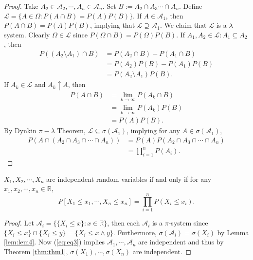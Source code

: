 \documentclass[11pt,singlecolumn, openany, citestyle=authoryear]{elegantbook}
\begin{document}
\begin{CJK}{UTF8}{gbsn}
\begin{proof}
    Take $A_2\in \mathcal{A}_2,\cdots,A_n \in\mathcal{A}_n$. Set $B:=A_2 \cap A_3\cdots \cap A_n$.
    Define $\mathcal{L}=\{A\in\Omega:P(A\cap B)=P(A)P(B)\}$. If $A \in \mathcal{A}_1$,
    then $P(A\cap B)=P(A)P(B)$, implying that $\mathcal{L}\supseteq \mathcal{A}_1$.
    We claim that $\mathcal{L}$ is a $\lambda$-system.
    Clearly $\Omega \in \mathcal{L}$ since $P(\Omega \cap B)=P(\Omega)P(B)$.
    If $A_1,A_2\in \mathcal{L}:A_1\subseteq A_2$, then 
    \begin{align*}
    P((A_2\setminus A_1) \cap B)&=P(A_2\cap B)-P(A_1 \cap B)\\
    &=P(A_2)P(B)-P(A_1)P(B)\\ 
    &=P(A_2\setminus A_1)P(B).
    \end{align*}
    If $A_k\in\mathcal{L}$ and $A_k \uparrow A$, then 
    \begin{align*}
        P(A\cap B) &= \lim_{k\to\infty} P(A_k\cap B)\\
        &=\lim_{k\to\infty}P(A_k)P(B)\\
        &=P(A)P(B).
    \end{align*}  
    By Dynkin $\pi-\lambda$ Theorem, $\mathcal{L}\subseteq \sigma(\mathcal{A}_1)$,
    implying for any $A \in \sigma(\mathcal{A}_1)$, 
    \begin{align*}
        P(A\cap (A_2 \cap A_3\cap\cdots\cap A_n)) &= P(A)P(A_2\cap A_3 \cap \cdots\cap A_n)\\
        &=\prod_{i=1}^n P(A_i).
    \end{align*}
\end{proof}

\begin{corollary}
    $X_1,X_2,\cdots,X_n$ are independent random variables if and only if 
    for any $x_1,x_2,\cdots,x_n \in \mathbb{R}$, 
    \begin{equation}\label{eq:eq3}
    P[X_1\leqslant x_1,\cdots,X_n\leqslant x_n]=\prod_{i=1}^n P(X_i\leqslant x_i).
    \end{equation}
\end{corollary}
\begin{proof}
    Let $\mathcal{A}_i=\{\{X_i\leqslant x\}:x\in\mathbb{R}\}$, then each $\mathcal{A}_i$
    is a $\pi$-system since $\{X_i\leqslant x\}\cap \{X_i\leqslant y\}=\{X_i\leqslant x\wedge y\}$. Furthermore,
    $\sigma(\mathcal{A}_i)=\sigma(X_i)$ by Lemma \ref{lem:lem4}.
    Now (\ref{eq:eq3}) implies $\mathcal{A}_1,\cdots,\mathcal{A}_n$ are independent 
    and thus by Theorem \ref{thm:thm1}, $\sigma(X_1),\cdots,\sigma(X_n)$ are independent.
\end{proof}


\end{CJK}
\end{document}
